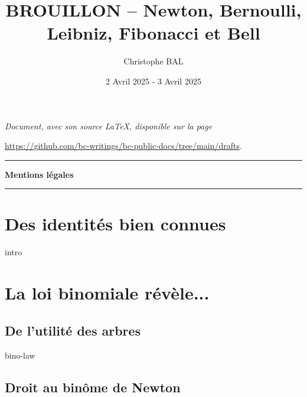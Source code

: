 \documentclass[12pt]{amsart}
\begin{document}
\title{BROUILLON -- Newton, Bernoulli, Leibniz, Fibonacci et Bell}
\author{Christophe BAL}
\date{2 Avril 2025 - 3 Avril 2025}

\maketitle

\begin{center}
	\itshape
	Document, avec son source \LaTeX, disponible sur la page

	\url{https://github.com/bc-writings/bc-public-docs/tree/main/drafts}.
\end{center}


\bigskip


\begin{center}
	\hrule\vspace{.3em}
	{
		\fontsize{1.35em}{1em}\selectfont
		\textbf{Mentions \og légales \fg}
	}

	\vspace{0.45em}
	\doclicenseThis
	\hrule
\end{center}


\bigskip


\setcounter{tocdepth}{2}
\tableofcontents




\newpage

\section{Des identités bien connues}

{intro}




\section{La loi binomiale révèle...}

\subsection{De l'utilité des arbres}

{bino-law}


\subsection{Droit au binôme de Newton}
\end{document}
